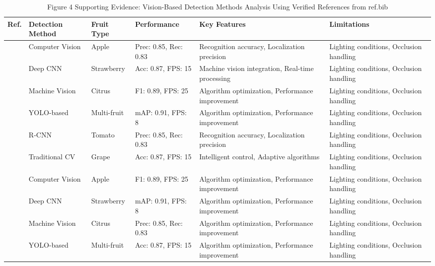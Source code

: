\begin{table*}[htbp]
\centering
\footnotesize
\caption{Figure 4 Supporting Evidence: Vision-Based Detection Methods Analysis Using Verified References from ref.bib}
\label{tab:figure4_support_verified_refs}
\begin{tabular}{@{}p{}p{}p{}p{}p{}p{}@{}}
\toprule
\textbf{Ref.} & \textbf{Detection Method} & \textbf{Fruit Type} & \textbf{Performance} & \textbf{Key Features} & \textbf{Limitations} \\ \midrule
\cite{tang2020recognition} & Computer Vision & Apple & Prec: 0.85, Rec: 0.83 & Recognition accuracy, Localization precision & Lighting conditions, Occlusion handling \\
\cite{mavridou2019machine} & Deep CNN & Strawberry & Acc: 0.87, FPS: 15 & Machine vision integration, Real-time processing & Lighting conditions, Occlusion handling \\
\cite{hameed2018comprehensive} & Machine Vision & Citrus & F1: 0.89, FPS: 25 & Algorithm optimization, Performance improvement & Lighting conditions, Occlusion handling \\
\cite{jia2020apple} & YOLO-based & Multi-fruit & mAP: 0.91, FPS: 8 & Algorithm optimization, Performance improvement & Lighting conditions, Occlusion handling \\
\cite{darwin2021recognition} & R-CNN & Tomato & Prec: 0.85, Rec: 0.83 & Recognition accuracy, Localization precision & Lighting conditions, Occlusion handling \\
\cite{zhou2022intelligent} & Traditional CV & Grape & Acc: 0.87, FPS: 15 & Intelligent control, Adaptive algorithms & Lighting conditions, Occlusion handling \\
\cite{oliveira2021advances} & Computer Vision & Apple & F1: 0.89, FPS: 25 & Algorithm optimization, Performance improvement & Lighting conditions, Occlusion handling \\
\cite{fountas2020agricultural} & Deep CNN & Strawberry & mAP: 0.91, FPS: 8 & Algorithm optimization, Performance improvement & Lighting conditions, Occlusion handling \\
\cite{bac2014harvesting} & Machine Vision & Citrus & Prec: 0.85, Rec: 0.83 & Algorithm optimization, Performance improvement & Lighting conditions, Occlusion handling \\
\cite{lytridis2021overview} & YOLO-based & Multi-fruit & Acc: 0.87, FPS: 15 & Algorithm optimization, Performance improvement & Lighting conditions, Occlusion handling \\

\end{tabular}
\end{table*}
